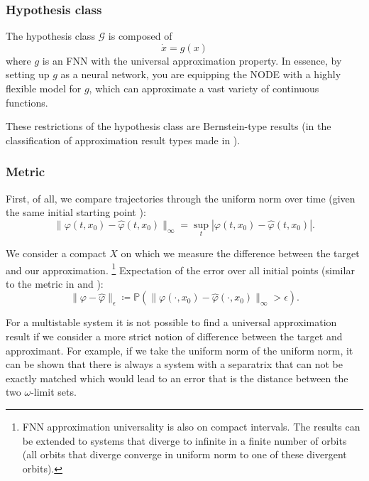 \documentclass{article}
\theoremstyle{definition}
\theoremstyle{remark}
\newcommand{\vol}{\operatorname{vol}}
\newcounter{ct}
\begin{document}
\subsubsection{Hypothesis class}\label{sec:hypothesis}
The hypothesis class $\mathcal{G}$ is composed of
\begin{equation}
\dot x = g(x) 
\end{equation}
where $g$ is an FNN with the universal approximation property.
In essence, by setting up $g$ as a neural network, you are equipping the NODE with a highly flexible model for $g$, which can approximate a vast variety of continuous functions. 

These restrictions of the hypothesis class are Bernstein-type results (in the classification of approximation result types made in \citep{jiang2023brief}).


\subsubsection{Metric}\label{sec:metric}
First, of all, we compare trajectories through the uniform norm over time (given the same initial starting point \citep{girard2007approximation}):
\begin{equation}
\|\varphi(t,x_0)-\hat \varphi(t,x_0)\|_\infty = \sup_t|\varphi(t,x_0)-\hat \varphi(t,x_0)|.
\end{equation}

We consider a compact $X$ on which we measure the difference between the target and our approximation.
\footnote{FNN approximation universality is also on compact intervals.
The results can be extended to systems that diverge to infinite in a finite number of orbits (all orbits that diverge converge in uniform norm to one of these divergent orbits).}
%
Expectation of the error over all initial points (similar to the metric in \citep{hammer2000approximation} and \citep{hanson2021learning}):
\begin{equation}
\|\varphi-\hat \varphi\|_\epsilon \coloneqq  \mathbb{P}\left(\|\varphi(\cdot,x_0)-\hat \varphi(\cdot,x_0)\|_\infty>\epsilon\right).
\end{equation}


For a multistable system it is not possible to find a universal approximation result if we consider a more strict notion of difference between the target and approximant.
For example, if we take the uniform norm of the uniform norm, it can be shown that there is always a system with a separatrix that can not be exactly matched which would lead to an error that is the distance between the two $\omega$-limit sets.
\end{document}
